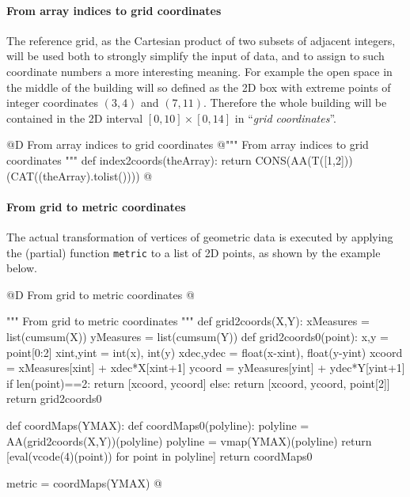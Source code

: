 \documentclass[11pt,oneside]{article}    %
\begin{document}
\paragraph{From array indices to grid coordinates}

The reference grid, as the Cartesian product of two subsets of adjacent integers, will be used both to strongly simplify the input of data, and to assign to such coordinate numbers a more interesting meaning. For example the open space in the middle of the building will so defined as the 2D box with extreme points of integer coordinates $(3,4)$ and $(7,11)$.
Therefore the whole building  will be contained in the 2D interval $[0,10]\times [0,14]$ in ``\emph{grid coordinates}''.

@D From array indices to grid coordinates
@{""" From array indices to grid coordinates """
def index2coords(theArray):
    return CONS(AA(T([1,2]))(CAT((theArray).tolist())))
@}


\paragraph{From grid to metric coordinates}
The actual transformation of vertices of geometric data is executed by applying the (partial) function \texttt{metric} to a list of 2D points, as shown by the example below.

@D From grid to metric coordinates
@{""" From grid to metric coordinates """
def grid2coords(X,Y):
    xMeasures = list(cumsum(X))
    yMeasures = list(cumsum(Y))
    def grid2coords0(point):
        x,y = point[0:2]
        xint,yint = int(x), int(y)
        xdec,ydec = float(x-xint), float(y-yint)
        xcoord = xMeasures[xint] + xdec*X[xint+1]
        ycoord = yMeasures[yint] + ydec*Y[yint+1]
        if len(point)==2: return [xcoord, ycoord]
        else: return [xcoord, ycoord, point[2]]
    return grid2coords0

def coordMaps(YMAX):
    def coordMaps0(polyline):
        polyline = AA(grid2coords(X,Y))(polyline)
        polyline = vmap(YMAX)(polyline)
        return [eval(vcode(4)(point)) for point in polyline]
    return coordMaps0

metric = coordMaps(YMAX)
@}
\end{document}
